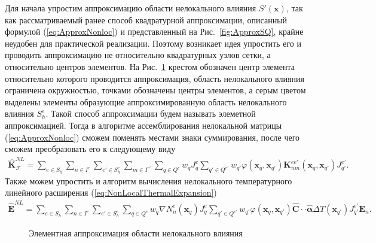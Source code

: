 Для начала упростим аппроксимацию области нелокального влияния $S'(\boldsymbol{x})$, так как рассматриваемый ранее способ квадратурной аппроксимации, описанный формулой (\ref{eq:ApproxNonloc}) и представленный на Рис.~\ref{fig:ApproxSQ}, крайне неудобен для практической реализации. Поэтому возникает идея упростить его и проводить аппроксимацию не относительно квадратурных узлов сетки, а относительно центров элементов. На Рис.~\ref{fig:ApproxSE} крестом обозначен центр элемента относительно которого проводится аппроксимация, область нелокального влияния ограничена окружностью, точками обозначены центры элементов, а серым цветом выделены элементы образующие аппроксимированную область нелокального влияния $S_h^e$. Такой способ аппроксимации будем называть элеметной аппроксимацией. Тогда в алгоритме ассемблирования нелокальной матрицы (\ref{eq:ApproxNonloc}) сможем поменять местами знаки суммирования, после чего сможем преобразовать его к следующему виду
\begin{gather}
	\label{eq:ApproxNonlocByElem}
	\widehat{\textbf{K}}^{NL}_{\mathcal{F}} =
	\sum\limits_{e \in S_h}
	\sum\limits_{n \in I^e}
	\sum\limits_{e' \in S_h^e}
	\sum\limits_{m \in I^{e'}}
	\sum\limits_{q \in Q^e}
	w_q J_q^e
	\sum\limits_{q' \in Q^{e'}}
	w_{q'} \varphi(\boldsymbol{x}_q, \boldsymbol{x}_{q'}) 
	\textbf{K}_{nm}^{e e'}(\boldsymbol{x}_q, \boldsymbol{x}_{q'}) J_{q'}^{e'}.
\end{gather}
Также можем упростить и алгоритм вычисления нелокального температурного линейного расширения (\ref{eq:NonLocalThermalExpansion}) 
\begin{gather}
	\label{eq:NonLocalThermalExpansionByElem}
	\widehat{\textbf{E}}^{NL} = 
	\sum\limits_{e \in S_h}
	\sum\limits_{n \in I^e}
	\sum\limits_{e' \in S_h^e}
	\sum\limits_{q \in Q^e}
	w_q \nabla N_n^e (\boldsymbol{x}_q) J_q^e
	\sum\limits_{q' \in Q^{e'}}
	w_{q'} \varphi (\boldsymbol{x}_q, \boldsymbol{x}_{q'}) \widehat{\mathbf{C}} \cdot \cdot \widehat{\boldsymbol{\alpha}} \Delta T (\boldsymbol{x}_{q'}) J_{q'}^{e'} \boldsymbol{E}_n.
\end{gather}

\begin{figure}[ht]
    \caption{Элементная аппроксимация области нелокального влияния}\label{fig:ApproxSE}
\end{figure}

